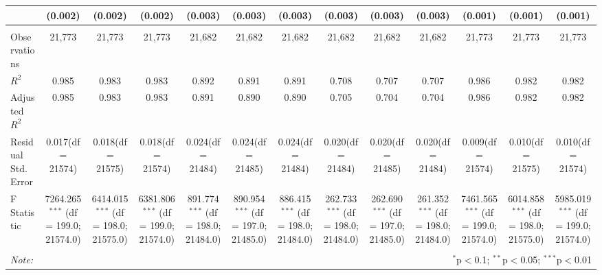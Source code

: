 \begin{table}[!htbp]
\begin{tabular}{@{\extracolsep{5pt}}lcccccccccccc}
  & (0.002) & (0.002) & (0.002) & (0.003) & (0.003) & (0.003) & (0.003) & (0.003) & (0.003) & (0.001) & (0.001) & (0.001) \\
\hline \\[-1.8ex]
 Observations & 21,773 & 21,773 & 21,773 & 21,682 & 21,682 & 21,682 & 21,682 & 21,682 & 21,682 & 21,773 & 21,773 & 21,773 \\
 $R^2$ & 0.985 & 0.983 & 0.983 & 0.892 & 0.891 & 0.891 & 0.708 & 0.707 & 0.707 & 0.986 & 0.982 & 0.982 \\
 Adjusted $R^2$ & 0.985 & 0.983 & 0.983 & 0.891 & 0.890 & 0.890 & 0.705 & 0.704 & 0.704 & 0.986 & 0.982 & 0.982 \\
 Residual Std. Error & 0.017(df = 21574) & 0.018(df = 21575) & 0.018(df = 21574) & 0.024(df = 21484) & 0.024(df = 21485) & 0.024(df = 21484) & 0.020(df = 21484) & 0.020(df = 21485) & 0.020(df = 21484) & 0.009(df = 21574) & 0.010(df = 21575) & 0.010(df = 21574)  \\
 F Statistic & 7264.265$^{***}$ (df = 199.0; 21574.0) & 6414.015$^{***}$ (df = 198.0; 21575.0) & 6381.806$^{***}$ (df = 199.0; 21574.0) & 891.774$^{***}$ (df = 198.0; 21484.0) & 890.954$^{***}$ (df = 197.0; 21485.0) & 886.415$^{***}$ (df = 198.0; 21484.0) & 262.733$^{***}$ (df = 198.0; 21484.0) & 262.690$^{***}$ (df = 197.0; 21485.0) & 261.352$^{***}$ (df = 198.0; 21484.0) & 7461.565$^{***}$ (df = 199.0; 21574.0) & 6014.858$^{***}$ (df = 198.0; 21575.0) & 5985.019$^{***}$ (df = 199.0; 21574.0) \\
\hline
\hline \\[-1.8ex]
\textit{Note:} & \multicolumn{12}{r}{$^{*}$p$<$0.1; $^{**}$p$<$0.05; $^{***}$p$<$0.01} \\
\end{tabular}
\end{table}